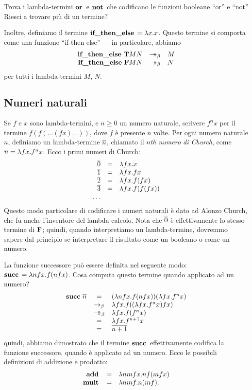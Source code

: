 \documentclass{article}
\begin{document}
\begin{exercise}
  Trova i lambda-termini $\mathop{\textbf{\bf or}\,}$ e $\mathop{\textbf{\bf not}\,}$ che codificano le funzioni
  booleane ``or'' e ``not'' Riesci a trovare pi\`u di un termine?
\end{exercise}

Inoltre, definiamo il termine $\mathop{\textbf{\bf if\_then\_else}\,}=\lambda x.x$. Questo termine si 
comporta come una funzione ``if-then-else'' --- in particolare, abbiamo
\[ \begin{array}{rcl}
  \ifthenelset \truet M N &\redbs& M \\
  \ifthenelset \falset M N &\redbs& N \\
\end{array}
\]
per tutti i lambda-termini $M$, $N$.

\subsection{Numeri naturali}\label{ssec-natural-numbers}

Se $f$ e $x$ sono lambda-termini, e $n\geq 0$ un numero naturale, scrivere
$f^nx$ per il termine $f(f(\ldots(fx)\ldots))$, dove $f$ \`e presente $n$
volte.  Per ogni numero naturale $n$, definiamo un lambda-termine
$\mathop{\overline{n}}$, chiamato il {\em $n$th numero di Church}, come $\mathop{\overline{n}}=\lambda
fx.f^nx$. Ecco i primi numeri di Church:
\[ \begin{array}{rcl}
  \mathop{\overline{0}} &=& \lambda fx.x \\
  \mathop{\overline{1}} &=& \lambda fx.fx \\
  \mathop{\overline{2}} &=& \lambda fx.f(fx) \\
  \mathop{\overline{3}} &=& \lambda fx.f(f(fx)) \\
  \ldots
\end{array}
\]
Questo modo particolare di codificare i numeri naturali \`e dato ad Alonzo
Church, che fu anche l'inventore del lambda-calcolo.
Nota che $\mathop{\overline{0}}$ \`e effettivamente lo stesso termine di ${\bf F}$; 
quindi, quando interpretiamo un lambda-termine, dovremmo sapere dal principio 
se interpretare il risultato come un booleano o come un numero.

La funzione successore pu\`o essere definita nel seguente modo: $\mathop{\textbf{\bf succ}\,} = \lambda
nfx.f(nfx)$. Cosa computa questo termine quando applicato ad un numero?
\[ \begin{array}{rcl}
  \mathop{\textbf{\bf succ}\,} \mathop{\overline{n}} &=& (\lambda nfx.f(nfx))(\lambda fx.f^nx) \\
  &\rightarrow_{\beta}& \lambda fx.f((\lambda fx.f^nx)fx) \\
  &\mathrel{\rightarrow\!\!\!\!\!\rightarrow}_{\beta}& \lambda fx.f(f^nx) \\
  &=& \lambda fx.f^{n+1}x \\
  &=& \mathop{\overline{n+1}}
\end{array}
\]
quindi, abbiamo dimostrato che il termine $\mathop{\textbf{\bf succ}\,}$ effettivamente codifica
la funzione successore, quando \`e applicato ad un numero. Ecco le possibili
definizioni di addizione e prodotto:
\[ \begin{array}{rcl}
  \mathop{\textbf{\bf add}\,} &=& \lambda nmfx.nf(mfx) \\
  \mathop{\textbf{\bf mult}\,} &=& \lambda nmf.n(mf). 
\end{array}
\]
\end{document}
